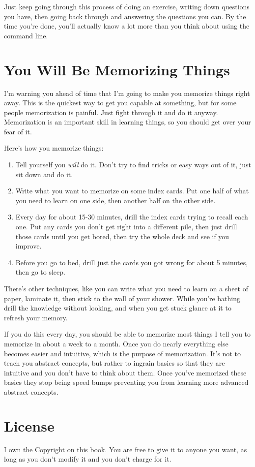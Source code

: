 Just keep going through this process of doing an exercise, writing down
questions you have, then going back through and answering the questions you
can.  By the time you're done, you'll actually know a lot more than you think
about using the command line.

\section{You Will Be Memorizing Things}

I'm warning you ahead of time that I'm going to make you memorize things right away.
This is the quickest way to get you capable at something, but for some people 
memorization is painful.  Just fight through it and do it anyway.  Memorization is an
important skill in learning things, so you should get over your fear of it.

Here's how you memorize things:

\begin{enumerate}
\item Tell yourself you \emph{will} do it.  Don't try to find tricks or easy ways out of it, just sit down and do it.
\item Write what you want to memorize on some index cards.  Put one half of what you need to learn on one side, then
    another half on the other side.
\item Every day for about 15-30 minutes, drill the index cards trying to recall each one.  Put any cards you don't
    get right into a different pile, then just drill those cards until you get bored, then try the whole deck and see
    if you improve.
\item Before you go to bed, drill just the cards you got wrong for about 5 minutes, then go to sleep.
\end{enumerate}

There's other techniques, like you can write what you need to learn on a sheet of paper, laminate it, then stick to the
wall of your shower.  While you're bathing drill the knowledge without looking, and when you get stuck glance at it
to refresh your memory.

If you do this every day, you should be able to memorize most things I tell you to memorize in about a week to a
month.  Once you do nearly everything else becomes easier and intuitive, which is the purpose of memorization.
It's not to teach you abstract concepts, but rather to ingrain basics so that they are intuitive and you don't
have to think about them.  Once you've memorized these basics they stop being speed bumps preventing you from
learning more advanced abstract concepts.


\section{License}

I own the Copyright on this book.  You are free to give it to anyone you want, as long as you 
don't modify it and you don't charge for it.
